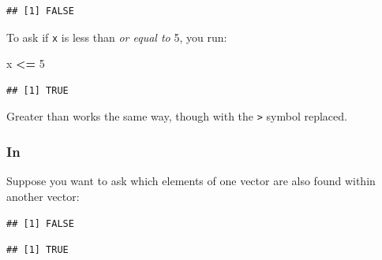 \documentclass[]{book}
\newenvironment{Shaded}{\begin{snugshade}}{\end{snugshade}}
\newcommand{\CommentTok}[1]{\textcolor[rgb]{0.56,0.35,0.01}{\textit{#1}}}
\newcommand{\DecValTok}[1]{\textcolor[rgb]{0.00,0.00,0.81}{#1}}
\newcommand{\KeywordTok}[1]{\textcolor[rgb]{0.13,0.29,0.53}{\textbf{#1}}}
\newcommand{\NormalTok}[1]{#1}
\newcommand{\OperatorTok}[1]{\textcolor[rgb]{0.81,0.36,0.00}{\textbf{#1}}}
\newcommand{\StringTok}[1]{\textcolor[rgb]{0.31,0.60,0.02}{#1}}
\begin{document}
\begin{verbatim}
## [1] FALSE
\end{verbatim}

To ask if \texttt{x} is less than \emph{or equal to} 5, you run:

\begin{Shaded}
\begin{Highlighting}[]
\NormalTok{x }\OperatorTok{<=}\StringTok{ }\DecValTok{5}
\end{Highlighting}
\end{Shaded}

\begin{verbatim}
## [1] TRUE
\end{verbatim}

Greater than works the same way, though with the \texttt{\textgreater{}} symbol replaced.

\hypertarget{in}{%
\subsubsection*{In}\label{in}}

Suppose you want to ask which elements of one vector are also found within another vector:

\begin{Shaded}
\end{Shaded}

\begin{verbatim}
## [1] FALSE
\end{verbatim}

\begin{Shaded}
\end{Shaded}

\begin{verbatim}
## [1] TRUE
\end{verbatim}

\begin{Shaded}
\end{Shaded}
\end{document}
